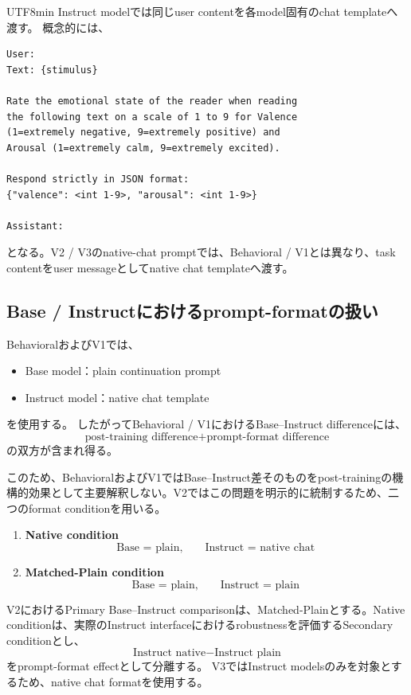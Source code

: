 \documentclass{article} %
\begin{document}
\begin{CJK*}{UTF8}{min}
Instruct modelでは同じuser contentを各model固有のchat templateへ渡す。
概念的には、
\begin{verbatim}
User:
Text: {stimulus}

Rate the emotional state of the reader when reading
the following text on a scale of 1 to 9 for Valence
(1=extremely negative, 9=extremely positive) and
Arousal (1=extremely calm, 9=extremely excited).

Respond strictly in JSON format:
{"valence": <int 1-9>, "arousal": <int 1-9>}

Assistant:
\end{verbatim}

となる。V2 / V3のnative-chat promptでは、Behavioral / V1とは異なり、task contentをuser messageとしてnative chat templateへ渡す。


\subsection{Base / Instructにおけるprompt-formatの扱い}
\label{app:prompt_format_control}

BehavioralおよびV1では、
\begin{itemize}
    \item Base model：plain continuation prompt
    \item Instruct model：native chat template
\end{itemize}
を使用する。
したがってBehavioral / V1におけるBase--Instruct differenceには、
\[
\text{post-training difference}
+
\text{prompt-format difference}
\]
の双方が含まれ得る。

このため、BehavioralおよびV1ではBase--Instruct差そのものをpost-trainingの機構的効果として主要解釈しない。V2ではこの問題を明示的に統制するため、二つのformat conditionを用いる。

\begin{enumerate}
    \item \textbf{Native condition}
    \[
    \text{Base = plain},
    \qquad
    \text{Instruct = native chat}
    \]

    \item \textbf{Matched-Plain condition}
    \[
    \text{Base = plain},
    \qquad
    \text{Instruct = plain}
    \]
\end{enumerate}

V2におけるPrimary Base--Instruct comparisonは、Matched-Plainとする。Native conditionは、実際のInstruct interfaceにおけるrobustnessを評価するSecondary conditionとし、
\[
\text{Instruct native}
-
\text{Instruct plain}
\]
をprompt-format effectとして分離する。
V3ではInstruct modelsのみを対象とするため、native chat formatを使用する。



\end{CJK*}
\end{document}
